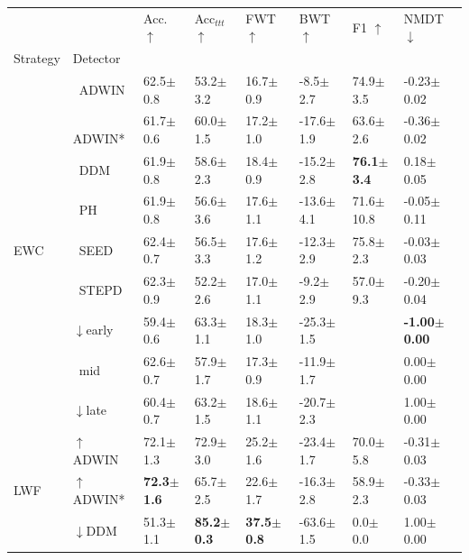 \begin{tabular}{llllllll}
\toprule
 &  & Acc. $\uparrow$ & Acc$_{ttt}$ $\uparrow$ & FWT $\uparrow$ & BWT $\uparrow$ & F1 $\uparrow$ & NMDT $\downarrow$ \\
Strategy & Detector &  &  &  &  &  &  \\
\midrule
\multirow[t]{9}{*}{EWC} & $\ \;$ADWIN & 62.5\tiny{$\pm$0.8} & 53.2\tiny{$\pm$3.2} & 16.7\tiny{$\pm$0.9} & -8.5\tiny{$\pm$2.7} & 74.9\tiny{$\pm$3.5} & -0.23\tiny{$\pm$0.02} \\
 & $\ \;$ADWIN* & 61.7\tiny{$\pm$0.6} & 60.0\tiny{$\pm$1.5} & 17.2\tiny{$\pm$1.0} & -17.6\tiny{$\pm$1.9} & 63.6\tiny{$\pm$2.6} & -0.36\tiny{$\pm$0.02} \\
 & $\ \;$DDM & 61.9\tiny{$\pm$0.8} & 58.6\tiny{$\pm$2.3} & 18.4\tiny{$\pm$0.9} & -15.2\tiny{$\pm$2.8} & \textbf{76.1\tiny{$\pm$3.4}} & 0.18\tiny{$\pm$0.05} \\
 & $\ \;$PH & 61.9\tiny{$\pm$0.8} & 56.6\tiny{$\pm$3.6} & 17.6\tiny{$\pm$1.1} & -13.6\tiny{$\pm$4.1} & 71.6\tiny{$\pm$10.8} & -0.05\tiny{$\pm$0.11} \\
 & $\ \;$SEED & 62.4\tiny{$\pm$0.7} & 56.5\tiny{$\pm$3.3} & 17.6\tiny{$\pm$1.2} & -12.3\tiny{$\pm$2.9} & 75.8\tiny{$\pm$2.3} & -0.03\tiny{$\pm$0.03} \\
 & $\ \;$STEPD & 62.3\tiny{$\pm$0.9} & 52.2\tiny{$\pm$2.6} & 17.0\tiny{$\pm$1.1} & -9.2\tiny{$\pm$2.9} & 57.0\tiny{$\pm$9.3} & -0.20\tiny{$\pm$0.04} \\
 & $\downarrow$early & 59.4\tiny{$\pm$0.6} & 63.3\tiny{$\pm$1.1} & 18.3\tiny{$\pm$1.0} & -25.3\tiny{$\pm$1.5} &  & \textbf{-1.00\tiny{$\pm$0.00}} \\
 & $\ \;$mid & 62.6\tiny{$\pm$0.7} & 57.9\tiny{$\pm$1.7} & 17.3\tiny{$\pm$0.9} & -11.9\tiny{$\pm$1.7} &  & 0.00\tiny{$\pm$0.00} \\
 & $\downarrow$late & 60.4\tiny{$\pm$0.7} & 63.2\tiny{$\pm$1.5} & 18.6\tiny{$\pm$1.1} & -20.7\tiny{$\pm$2.3} &  & 1.00\tiny{$\pm$0.00} \\
\midrule
\multirow[t]{9}{*}{LWF} & $\uparrow$ADWIN & 72.1\tiny{$\pm$1.3} & 72.9\tiny{$\pm$3.0} & 25.2\tiny{$\pm$1.6} & -23.4\tiny{$\pm$1.7} & 70.0\tiny{$\pm$5.8} & -0.31\tiny{$\pm$0.03} \\
 & $\uparrow$ADWIN* & \textbf{72.3\tiny{$\pm$1.6}} & 65.7\tiny{$\pm$2.5} & 22.6\tiny{$\pm$1.7} & -16.3\tiny{$\pm$2.8} & 58.9\tiny{$\pm$2.3} & -0.33\tiny{$\pm$0.03} \\
 & $\downarrow$DDM & 51.3\tiny{$\pm$1.1} & \textbf{85.2\tiny{$\pm$0.3}} & \textbf{37.5\tiny{$\pm$0.8}} & -63.6\tiny{$\pm$1.5} & 0.0\tiny{$\pm$0.0} & 1.00\tiny{$\pm$0.00} \\

\end{tabular}
